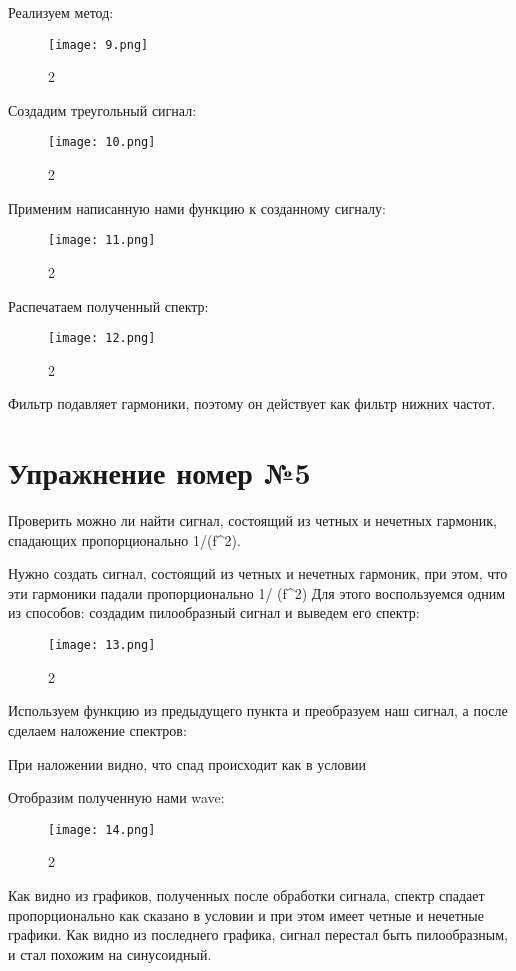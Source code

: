 \documentclass[10pt,a4paper,oneside]{article}
\begin{document}
Реализуем метод: 

\begin{figure}[H]
        \centering
        \texttt{[image: 9.png]}
        \caption{2}
        \label{fig:first}
\end{figure}

Создадим треугольный сигнал:

\begin{figure}[H]
        \centering
        \texttt{[image: 10.png]}
        \caption{2}
        \label{fig:first}
\end{figure}

Применим написанную нами функцию к созданному сигналу: 

\begin{figure}[H]
        \centering
        \texttt{[image: 11.png]}
        \caption{2}
        \label{fig:first}
\end{figure}

Распечатаем полученный спектр: 

\begin{figure}[H]
        \centering
        \texttt{[image: 12.png]}
        \caption{2}
        \label{fig:first}
\end{figure}

Фильтр подавляет гармоники, поэтому он действует как фильтр нижних частот.
\section{Упражнение номер №5}
Проверить можно ли найти сигнал, состоящий из четных и нечетных гармоник, спадающих пропорционально 1/(f^2).

Нужно создать сигнал, состоящий из четных и нечетных гармоник, при этом, что эти гармоники падали пропорционально 1/ (f^2) Для этого воспользуемся одним из способов: создадим пилообразный сигнал и выведем его спектр:  

\begin{figure}[H]
        \centering
        \texttt{[image: 13.png]}
        \caption{2}
        \label{fig:first}
\end{figure}

Используем функцию из предыдущего пункта и преобразуем наш сигнал, а после сделаем наложение спектров: 

При наложении видно, что спад происходит как в условии

Отобразим полученную нами wave:

\begin{figure}[H]
        \centering
        \texttt{[image: 14.png]}
        \caption{2}
        \label{fig:first}
\end{figure}

Как видно из графиков, полученных после обработки сигнала, спектр спадает пропорционально как сказано в условии и при этом имеет четные и нечетные графики. Как видно из последнего графика, сигнал перестал быть пилообразным, и стал похожим на синусоидный.
\end{document}
